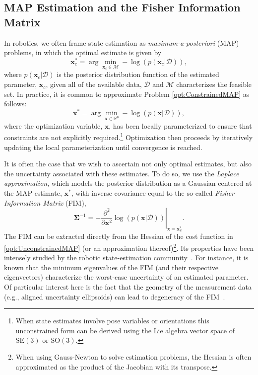 \documentclass[lettersize,journal]{IEEEtran}
\begin{document}
\subsection{MAP Estimation and the Fisher Information Matrix}\label{sec:MeasModels}

In robotics, we often frame state estimation as \emph{maximum-a-posteriori} (MAP) problems, in which the optimal estimate is given by
\begin{equation}\label{opt:ConstrainedMAP}
	\bm{x}_c^* = \arg\min\limits_{\bm{x}_c\in\mathcal{M}} -\log\left(p(\bm{x}_c \vert \bm{\mathcal{D}})\right),
\end{equation}
where $p(\bm{x}_c \vert \bm{\mathcal{D}})$ is the posterior distribution function of the estimated parameter, $\bm{x}_c$, given all of the available data, $\bm{\mathcal{D}}$ and $\mathcal{M}$ characterizes the feasible set. In practice, it is common to approximate Problem \eqref{opt:ConstrainedMAP} as follows:
\begin{equation}\label{opt:UnconstrainedMAP}
	\bm{x}^*=\arg\min\limits_{\bm{x}\in\mathbb{R}^p} -\log\left(p(\bm{x} \vert \bm{\mathcal{D}})\right),
\end{equation}
where the optimization variable, $\bm{x}$, has been locally parameterized to ensure that constraints are not explicitly required.\footnote{When state estimates involve pose variables or orientations this unconstrained form can be derived using the Lie algebra vector space of $\mbox{SE}(3)$ or $\mbox{SO}(3)$.}
Optimization then proceeds by iteratively updating the local parameterization until convergence is reached.

It is often the case that we wish to ascertain not only optimal estimates, but also the uncertainty associated with these estimates. To do so, we use the \emph{Laplace approximation}, which models the posterior distribution as a Gaussian centered at the MAP estimate, $\bm{x}^*$, with inverse covariance equal to the so-called \emph{Fisher Information Matrix} (FIM), 
\begin{equation}
	\bm{\Sigma}^{-1} = -\left.\frac{\partial^2}{\partial\bm{x}^2}\log\left(p(\bm{x} \vert \bm{\mathcal{D}})\right)\right|_{\bm{x}=\bm{x}^*_u}.
\end{equation}
The FIM can be extracted directly from the Hessian of the cost function in \eqref{opt:UnconstrainedMAP} (or an approximation thereof)\footnote{When using Gauss-Newton to solve estimation problems, the Hessian is often approximated as the product of the Jacobian with its transpose.}. Its properties have been intensely studied by the robotic state-estimation community~\cite{censiAchievableAccuracyPose2009}. For instance, it is known that the minimum eigenvalues of the FIM (and their respective eigenvectors) characterize the worst-case uncertainty of an estimated parameter. 
Of particular interest here is the fact that the geometry of the measurement data (e.g., aligned uncertainty ellipsoids) can lead to degeneracy of the FIM~\cite{zhangDegeneracyOptimizationbasedState2016}.
\end{document}
